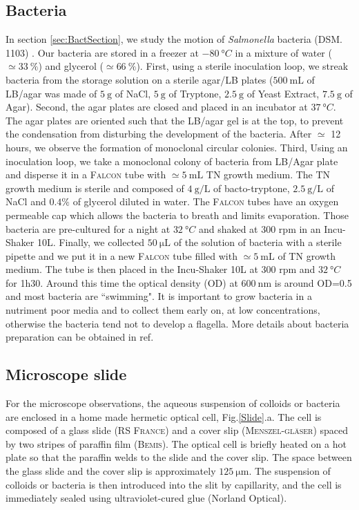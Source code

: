 \documentclass[%
 aip,
 jmp,%
 amsmath,amssymb,
reprint,%
]{revtex4-1}
\begin{document}
\subsection{Bacteria}
In section \ref{sec:BactSection}, we study the motion of \textit{Salmonella} bacteria (DSM. 1103) \citep{21_fabrega2013salmonella}. Our bacteria are stored in a freezer at $\SI{-80}{\degree C}$ in a mixture of water ($\simeq \SI{33}{\%}$) and glycerol ($\simeq \SI{66}{\%}$). First, using a sterile inoculation loop, we streak bacteria from the storage solution on a sterile agar/LB plates  ($\SI{500}{\milli\liter}$ of LB/agar was made of $\SI{5}{\gram}$ of NaCl, $\SI{5}{\gram}$ of Tryptone, $\SI{2.5}{\gram}$ of Yeast Extract, $\SI{7.5}{\gram}$ of Agar). Second, the agar plates are closed and placed in an incubator at $\SI{37}{\degree C}$. The agar plates are oriented such that the LB/agar gel is at the top, to prevent the condensation from disturbing the development of the bacteria. After $\simeq$ 12 hours, we observe the formation of monoclonal circular colonies. Third, Using an inoculation loop, we take a monoclonal colony of bacteria from LB/Agar plate and disperse it in a \textsc{Falcon} tube with $\simeq \SI{5}{\milli\liter}$ TN growth medium. The TN growth medium is sterile and composed of $\SI{4}{\gram\per\liter}$ of bacto-tryptone, $\SI{2.5}{\gram\per\liter}$ of NaCl and $0.4\%$ of glycerol diluted in water. The \textsc{Falcon} tubes have an oxygen permeable cap which allows the bacteria to breath and limits evaporation. Those bacteria are pre-cultured for a night at $\SI{32}{\degree C}$ and shaked at 300 rpm in an Incu-Shaker 10L. Finally, we collected $\SI{50}{\micro\liter}$ of the solution of bacteria with a sterile pipette and we put it in a new \textsc{Falcon} tube filled with $\simeq \SI{5}{\milli\liter}$ of TN growth medium. The tube is then placed in the Incu-Shaker 10L at 300 rpm and $\SI{32}{\degree C}$ for 1h30. Around this time the optical density (OD) at $\SI{600}{\nano\meter}$ is around OD=0.5 and most bacteria are ``swimming". It is important to grow bacteria in a nutriment poor media and to collect them early on, at low concentrations, otherwise the bacteria tend not to develop a flagella. More details about bacteria preparation can be obtained in ref\cite{Schwarz2015}.

\subsection{Microscope slide}
For the microscope observations, the aqueous suspension of colloids or bacteria are enclosed in a home made hermetic optical cell, Fig.\ref{Slide}.a. The cell is composed of a  glass slide (\textsc{RS France}) and a cover slip (\textsc{Menszel-gl\"aser}) spaced by two stripes of paraffin film (\textsc{Bemis}). The optical cell is briefly heated on a hot plate so that the paraffin welds to the slide and the cover slip. The space between the glass slide and the cover slip is approximately $\SI{125}{\micro\meter}$. The suspension of colloids or bacteria is then introduced into the slit by capillarity, and the cell is immediately sealed using ultraviolet-cured glue (Norland Optical).
\end{document}
